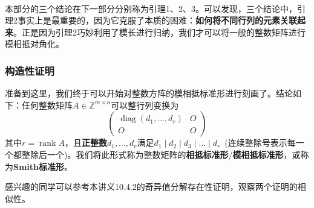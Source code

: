 \documentclass[a4paper,UTF8,fontset=windows,AutoFakeBold]{ctexart}
\DeclareMathOperator{\diag}{diag}
\DeclareMathOperator{\rank}{rank}
\newcommand*{\note}{\noindent *}
\begin{document}
\

\note 本部分的三个结论在下一部分分别称为引理1、2、3。可以发现，三个结论中，引理2事实上是最重要的，因为它克服了本质的困难：\textbf{如何将不同行列的元素关联起来}。正是因为引理2巧妙利用了模长进行归纳，我们才可以将一般的整数矩阵进行模相抵对角化。

\subsubsection{构造性证明}
准备到这里，我们终于可以开始对整数方阵的模相抵标准形进行刻画了。结论如下：任何整数矩阵$A\in\mathbb{Z}^{m\times n}$可以整行列变换为
$$\begin{pmatrix}\diag(d_1,\dots,d_r)&O\\O&O\end{pmatrix}$$
其中$r=\rank A$，且\textbf{正整数}$d_1,\dots,d_r$满足$d_1\mid d_2\mid d_3\mid\dots\mid d_r$\ (连续整除号表示每一个都整除后一个)。我们将此形式称为整数矩阵的\textbf{相抵标准形}/\textbf{模相抵标准形}，或称为\textbf{Smith标准形}。

\note 感兴趣的同学可以参考本讲义10.4.2的奇异值分解存在性证明，观察两个证明的相似性。
\end{document}
